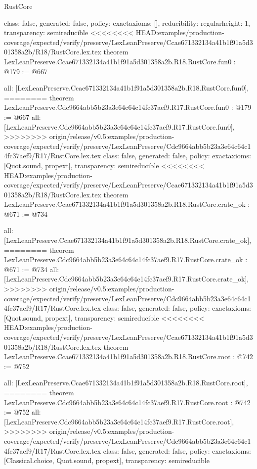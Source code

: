 \begin{lexlean}{RustCore}
\begin{coremodule}
{\begin{coremodule}
{{{  class: false,
  generated: false,
  policy: exact{axioms: []},
  reducibility: regular{height: 1},
  transparency: semireducible
}
<<<<<<<< HEAD:examples/production-coverage/expected/verify/preserve/LexLeanPreserve/Ccae671332134a41b1f91a5d301358a2b/R18/RustCore.lex.tex
theorem LexLeanPreserve.Ccae671332134a41b1f91a5d301358a2b.R18.RustCore.fun0 : @179 := @667 {
  all: [LexLeanPreserve.Ccae671332134a41b1f91a5d301358a2b.R18.RustCore.fun0],
========
theorem LexLeanPreserve.Cdc9664abb5b23a3e64c64c14fc37aef9.R17.RustCore.fun0 : @179 := @667 {
  all: [LexLeanPreserve.Cdc9664abb5b23a3e64c64c14fc37aef9.R17.RustCore.fun0],
>>>>>>>> origin/release/v0.5:examples/production-coverage/expected/verify/preserve/LexLeanPreserve/Cdc9664abb5b23a3e64c64c14fc37aef9/R17/RustCore.lex.tex
  class: false,
  generated: false,
  policy: exact{axioms: [Quot.sound, propext]},
  transparency: semireducible
}
<<<<<<<< HEAD:examples/production-coverage/expected/verify/preserve/LexLeanPreserve/Ccae671332134a41b1f91a5d301358a2b/R18/RustCore.lex.tex
theorem LexLeanPreserve.Ccae671332134a41b1f91a5d301358a2b.R18.RustCore.crate_ok : @671 := @734 {
  all: [LexLeanPreserve.Ccae671332134a41b1f91a5d301358a2b.R18.RustCore.crate_ok],
========
theorem LexLeanPreserve.Cdc9664abb5b23a3e64c64c14fc37aef9.R17.RustCore.crate_ok : @671 := @734 {
  all: [LexLeanPreserve.Cdc9664abb5b23a3e64c64c14fc37aef9.R17.RustCore.crate_ok],
>>>>>>>> origin/release/v0.5:examples/production-coverage/expected/verify/preserve/LexLeanPreserve/Cdc9664abb5b23a3e64c64c14fc37aef9/R17/RustCore.lex.tex
  class: false,
  generated: false,
  policy: exact{axioms: [Quot.sound, propext]},
  transparency: semireducible
}
<<<<<<<< HEAD:examples/production-coverage/expected/verify/preserve/LexLeanPreserve/Ccae671332134a41b1f91a5d301358a2b/R18/RustCore.lex.tex
theorem LexLeanPreserve.Ccae671332134a41b1f91a5d301358a2b.R18.RustCore.root : @742 := @752 {
  all: [LexLeanPreserve.Ccae671332134a41b1f91a5d301358a2b.R18.RustCore.root],
========
theorem LexLeanPreserve.Cdc9664abb5b23a3e64c64c14fc37aef9.R17.RustCore.root : @742 := @752 {
  all: [LexLeanPreserve.Cdc9664abb5b23a3e64c64c14fc37aef9.R17.RustCore.root],
>>>>>>>> origin/release/v0.5:examples/production-coverage/expected/verify/preserve/LexLeanPreserve/Cdc9664abb5b23a3e64c64c14fc37aef9/R17/RustCore.lex.tex
  class: false,
  generated: false,
  policy: exact{axioms: [Classical.choice, Quot.sound, propext]},
  transparency: semireducible
}

}}}}}
\end{coremodule}}
\end{coremodule}
\end{lexlean}
